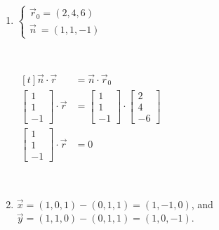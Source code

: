 \documentclass[11pt,fleqn]{book} %
\begin{document}
\begin{enumerate}
    {~~~}

    \item
    $\begin{cases}
        \vec{r}_0 = (2, 4, 6) \\
        \vec{n} ~= (1, 1, -1)
    \end{cases}$

    {~~~}

    $\begin{aligned}[t]
        \vec{n} \cdot \vec{r}                                    
        & = \vec{n} \cdot \vec{r}_0                                                                     \\
        \begin{bmatrix} 1 \\ 1 \\ -1 \end{bmatrix} \cdot \vec{r} 
        & = \begin{bmatrix} 1 \\ 1 \\ -1 \end{bmatrix} \cdot \begin{bmatrix} 2 \\ 4 \\ -6 \end{bmatrix} \\
        \begin{bmatrix} 1 \\ 1 \\ -1 \end{bmatrix} \cdot \vec{r} & = 0
    \end{aligned}$

    {~~~}

    \item
    $\vec{x} = (1, 0, 1) - (0, 1, 1) = (1, -1, 0)$, and $\vec{y} = (1, 1, 0) - (0, 1, 1) = (1, 0, -1)$.

    {~~~}


\end{enumerate}
\end{document}

